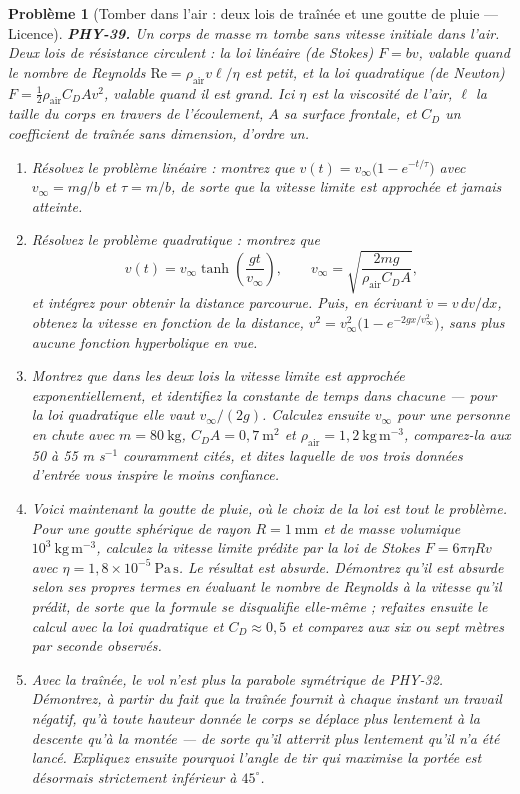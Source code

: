 \documentclass[11pt]{article}
\newtheorem{problem}{Problème}
\begin{document}
\begin{problem}[{Tomber dans l'air : deux lois de traînée et une goutte de pluie --- Licence}]
\textbf{PHY-39.} Un corps de masse $ m $ tombe sans vitesse initiale dans l'air. Deux lois de
résistance circulent : la loi linéaire (de Stokes) $ F = bv $, valable quand le nombre de
Reynolds $ \mathrm{Re} = \rho_{\text{air}} v \ell / \eta $ est petit, et la loi quadratique (de
Newton) $ F = \tfrac12 \rho_{\text{air}} C_{D} A v^{2} $, valable quand il est grand. Ici
$ \eta $ est la viscosité de l'air, $ \ell $ la taille du corps en travers de l'écoulement,
$ A $ sa surface frontale, et $ C_{D} $ un coefficient de traînée sans dimension, d'ordre
un.
\begin{enumerate}
\item[(a)] Résolvez le problème linéaire : montrez que
$ v(t) = v_{\infty}\bigl(1 - e^{-t/\tau}\bigr) $ avec $ v_{\infty} = mg/b $ et
$ \tau = m/b $, de sorte que la vitesse limite est approchée et jamais atteinte.
\item[(b)] Résolvez le problème quadratique : montrez que
\[ v(t) = v_{\infty}\tanh\!\left(\frac{gt}{v_{\infty}}\right), \qquad
v_{\infty} = \sqrt{\frac{2mg}{\rho_{\text{air}} C_{D} A}}, \]
et intégrez pour obtenir la distance parcourue. Puis, en écrivant $ \dot v = v \, dv/dx $,
obtenez la vitesse en fonction de la distance,
$ v^{2} = v_{\infty}^{2}\bigl(1 - e^{-2gx/v_{\infty}^{2}}\bigr) $, sans plus aucune fonction
hyperbolique en vue.
\item[(c)] Montrez que dans les deux lois la vitesse limite est approchée exponentiellement, et
identifiez la constante de temps dans chacune --- pour la loi quadratique elle vaut
$ v_{\infty}/(2g) $. Calculez ensuite $ v_{\infty} $ pour une personne en chute avec
$ m = 80\ \mathrm{kg} $, $ C_{D}A = 0{,}7\ \mathrm{m^{2}} $ et
$ \rho_{\text{air}} = 1{,}2\ \mathrm{kg\,m^{-3}} $, comparez-la aux 50 à 55 m s$ ^{-1} $
couramment cités, et dites laquelle de vos trois données d'entrée vous inspire le moins
confiance.
\item[(d)] Voici maintenant la goutte de pluie, où le choix de la loi est tout le problème. Pour une
goutte sphérique de rayon $ R = 1\ \mathrm{mm} $ et de masse volumique
$ 10^{3}\ \mathrm{kg\,m^{-3}} $, calculez la vitesse limite prédite par la loi de Stokes
$ F = 6\pi\eta R v $ avec $ \eta = 1{,}8\times10^{-5}\ \mathrm{Pa\,s} $. Le résultat est
absurde. Démontrez qu'il est absurde selon ses propres termes en évaluant le nombre de Reynolds
à la vitesse qu'il prédit, de sorte que la formule se disqualifie elle-même ; refaites ensuite le
calcul avec la loi quadratique et $ C_{D} \approx 0{,}5 $ et comparez aux six ou sept mètres
par seconde observés.
\item[(e)] Avec la traînée, le vol n'est plus la parabole symétrique de PHY-32. Démontrez, à partir du
fait que la traînée fournit à chaque instant un travail négatif, qu'à toute hauteur donnée le
corps se déplace plus lentement à la descente qu'à la montée --- de sorte qu'il atterrit plus
lentement qu'il n'a été lancé. Expliquez ensuite pourquoi l'angle de tir qui maximise la portée
est désormais strictement inférieur à $ 45^{\circ} $.
\end{enumerate}


\end{problem}
\end{document}
